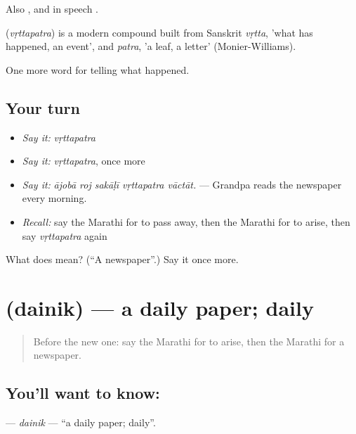 Also , and in speech .

\begin{cousinweb}
\textbf{} (\emph{vṛttapatra}) is a modern compound built from Sanskrit \emph{vṛtta}, 'what has happened, an event', and \emph{patra}, 'a leaf, a letter' (Monier-Williams).
\end{cousinweb}

\begin{grammarlens}[title={What you've built}]
One more word for telling what happened.
\end{grammarlens}

\subsection*{Your turn}
\begin{itemize}
\raggedright
  \item \emph{Say it:} \emph{vṛttapatra}
  \item \emph{Say it:} \emph{vṛttapatra}, once more
  \item \emph{Say it:} \emph{ājobā roj sakāḷī vṛttapatra vāctāt.} — Grandpa reads the newspaper every morning.
  \item \emph{Recall:} say the Marathi for to pass away, then the Marathi for to arise, then say \emph{vṛttapatra} again
\end{itemize}

\begin{tcolorbox}[breakable,colback=teal!4,colframe=teal!35!black,title={Before you move on}]
What does  mean? (\textquotedblleft{}A newspaper\textquotedblright{}.) Say it once more.
\end{tcolorbox}
\section[\texorpdfstring{\mr{दैनिक} (dainik)}{दैनिक (dainik)}]{ (dainik) — a daily paper; daily}

\label{lesson:MR-C310-dainik}



\begin{quote}
Before the new one: say the Marathi for to arise, then the Marathi for a newspaper.
\end{quote}

\subsection*{You'll want to know: }
\textbf{} — \emph{dainik} — \textquotedblleft{}a daily paper; daily\textquotedblright{}.

